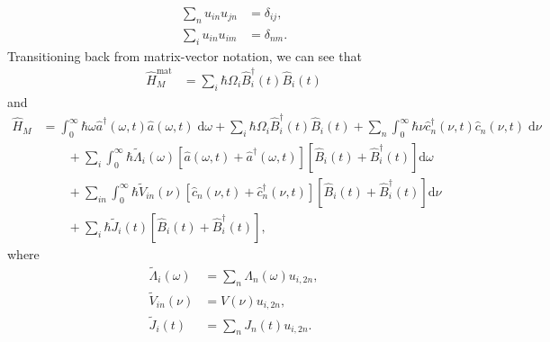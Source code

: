 \documentclass{article}
\begin{document}
\begin{equation}
\begin{split}
\sum_nu_{in}u_{jn} &= \delta_{ij},\\
\sum_iu_{in}u_{im} &= \delta_{nm}.
\end{split}
\end{equation}
Transitioning back from matrix-vector notation, we can see that
\begin{equation}
\begin{split}
\hat{H}_M^\mathrm{mat} &= \sum_i\hbar\Omega_i\hat{B}_i^\dagger(t)\hat{B}_i(t)
\end{split}
\end{equation}
and
\begin{equation}
\begin{split}
\hat{H}_M 
&= \int_0^\infty\hbar\omega\hat{a}^\dagger(\omega,t)\hat{a}(\omega,t)\;\mathrm{d}\omega + \sum_i\hbar\Omega_i\hat{B}_i^\dagger(t)\hat{B}_i(t) + \sum_n\int_0^\infty\hbar\nu\hat{c}_n^\dagger(\nu,t)\hat{c}_n(\nu,t)\;\mathrm{d}\nu\\
&\qquad + \sum_i\int_0^\infty\hbar\tilde{\Lambda}_i(\omega)\left[\hat{a}(\omega,t) + \hat{a}^\dagger(\omega,t)\right]\left[\hat{B}_i(t) + \hat{B}_i^\dagger(t)\right]\mathrm{d}\omega\\
&\qquad + \sum_{in}\int_0^\infty\hbar\tilde{V}_{in}(\nu)\left[\hat{c}_n(\nu,t) + \hat{c}_n^\dagger(\nu,t)\right]\left[\hat{B}_i(t) + \hat{B}_i^\dagger(t)\right]\mathrm{d}\nu\\
&\qquad + \sum_i\hbar \tilde{J}_i(t)\left[\hat{B}_i(t) + \hat{B}_i^\dagger(t)\right],
\end{split}
\end{equation}
where
\begin{equation}
\begin{split}
\tilde{\Lambda}_i(\omega) &= \sum_n\Lambda_n(\omega)u_{i,2n},\\
\tilde{V}_{in}(\nu) &= V(\nu)u_{i,2n},\\
\tilde{J}_{i}(t) &= \sum_nJ_n(t)u_{i,2n}.
\end{split}
\end{equation}
\end{document}
